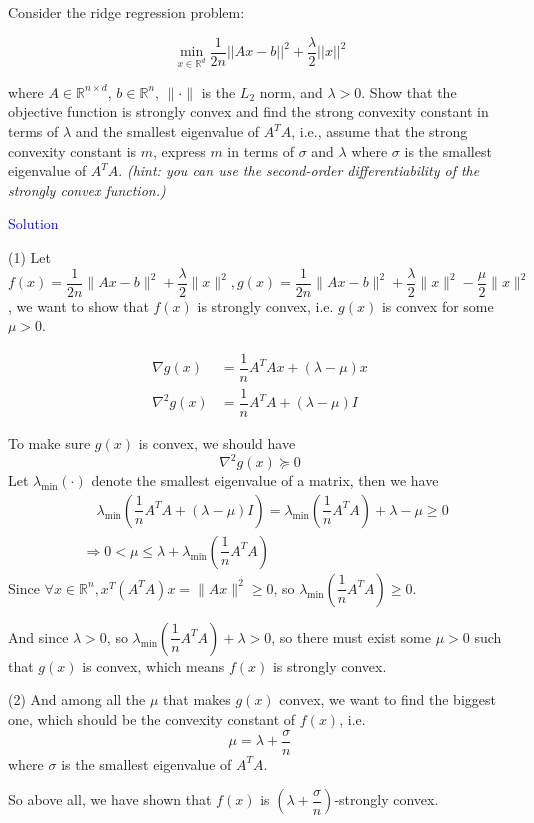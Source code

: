 Consider the ridge regression problem:

$$\min_{x \in \mathbb{R}^d} \frac{1}{2n} ||Ax - b||^2 + \frac{\lambda}{2} ||x||^2$$

where $A \in \mathbb{R}^{n \times d}$, $b \in \mathbb{R}^n$, $\|\cdot\|$ is the $L_2$ norm, and $\lambda > 0$. Show that the objective function is strongly convex  and find the strong convexity constant in terms of $\lambda$ and the smallest eigenvalue of $A^T A$, i.e., assume that the strong convexity constant is $m$, express $m$ in terms of $\sigma$ and $\lambda$ where $\sigma$ is the smallest eigenvalue of $A^T A$. \emph{(hint: you can use the second-order differentiability of the strongly convex function.)}

\textcolor{blue}{Solution}

(1) Let $f(x)=\dfrac{1}{2n}\|Ax-b\|^2+\dfrac{\lambda}{2}\|x\|^2, g(x)=\dfrac{1}{2n}\|Ax-b\|^2+\dfrac{\lambda}{2}\|x\|^2-\dfrac{\mu}{2}\|x\|^2$, we want to show that $f(x)$ is strongly convex, i.e. $g(x)$ is convex for some $\mu>0$.

\begin{align*}
\nabla g(x) &= \dfrac{1}{n}A^TAx+(\lambda-\mu)x \\
\nabla^2 g(x) &= \dfrac{1}{n}A^TA+(\lambda-\mu)I
\end{align*}

To make sure $g(x)$ is convex, we should have $$\nabla^2 g(x) \succeq 0$$
Let $\lambda_{\min}(\cdot)$ denote the smallest eigenvalue of a matrix, then we have
\begin{align*}
&\quad \lambda_{\min}\left(\dfrac{1}{n}A^TA+\left(\lambda-\mu\right)I\right) = \lambda_{\min}\left(\dfrac{1}{n}A^TA\right)+\lambda-\mu \geq 0 \\
&\Rightarrow 0 < \mu \leq \lambda+\lambda_{\min}\left(\dfrac{1}{n}A^TA\right)
\end{align*}
Since $\forall x\in \mathbb{R}^n, x^T (A^TA) x = \|Ax\|^2 \geq 0$, so $\lambda_{\min}\left(\dfrac{1}{n}A^TA\right) \geq 0$.

And since $\lambda>0$, so $\lambda_{\min}\left(\dfrac{1}{n}A^TA\right)+\lambda > 0$, so there must exist some $\mu>0$ such that $g(x)$ is convex, which means $f(x)$ is strongly convex.

(2) And among all the $\mu$ that makes $g(x)$ convex, we want to find the biggest one, which should be the convexity constant of $f(x)$, i.e.
$$\mu = \lambda + \dfrac{\sigma}{n}$$
where $\sigma$ is the smallest eigenvalue of $A^TA$.

So above all, we have shown that $f(x)$ is $\left(\lambda+\dfrac{\sigma}{n}\right)$-strongly convex.